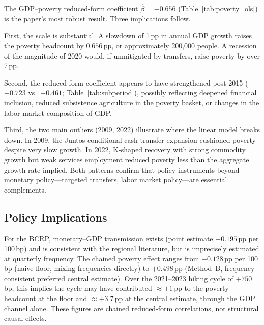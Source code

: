 \documentclass[12pt,letterpaper]{article}
\begin{document}
The GDP--poverty reduced-form coefficient $\hat\beta=-0.656$
(Table~\ref{tab:poverty_ols}) is the paper's most robust result.
Three implications follow.

First, the scale is substantial. A slowdown of 1\,pp in annual GDP growth
raises the poverty headcount by $0.656$\,pp, or approximately 200,000
people. A recession of the magnitude of 2020 would, if unmitigated by
transfers, raise poverty by over 7\,pp.

Second, the reduced-form coefficient appears to have strengthened post-2015
($-0.723$ vs.\ $-0.461$; Table~\ref{tab:subperiod}), possibly reflecting
deepened financial inclusion, reduced subsistence agriculture in the poverty
basket, or changes in the labor market composition of GDP.

Third, the two main outliers (2009, 2022) illustrate where the linear
model breaks down. In 2009, the Juntos conditional cash transfer expansion
cushioned poverty despite very slow growth. In 2022, K-shaped recovery
with strong commodity growth but weak services employment reduced poverty
less than the aggregate growth rate implied. Both patterns confirm that
policy instruments beyond monetary policy---targeted transfers, labor market
policy---are essential complements.

\subsection{Policy Implications}

For the BCRP, monetary--GDP transmission exists (point estimate $-0.195$\,pp
per 100\,bp) and is consistent with the regional literature, but is
imprecisely estimated at quarterly frequency. The chained poverty effect ranges from $+0.128$\,pp per 100\,bp (naive floor,
mixing frequencies directly) to $+0.498$\,pp (Method~B, frequency-consistent
preferred central estimate).
Over the 2021--2023 hiking cycle of $+750$\,bp, this implies the cycle may
have contributed $\approx+1$\,pp to the poverty headcount at the floor and
$\approx+3.7$\,pp at the central estimate, through the GDP channel alone.
These figures are chained reduced-form correlations, not structural causal
effects.
\end{document}
